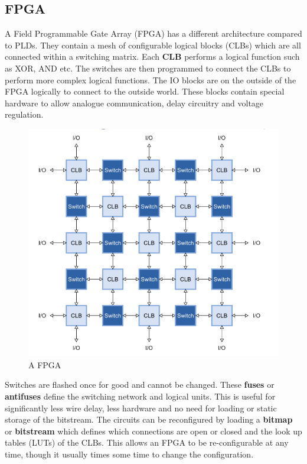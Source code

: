 \documentclass[11pt]{article}
\begin{document}
\subsection{FPGA}
A Field Programmable Gate Array (FPGA) has a different architecture compared to PLDs. They contain a mesh of configurable logical blocks (CLBs) which are all connected within a switching matrix. Each \textbf{CLB} performs a logical function such as XOR, AND etc. The switches are then programmed to connect the CLBs to perform more complex logical functions. The IO blocks are on the outside of the FPGA logically to connect to the outside world. These blocks contain special hardware to allow analogue communication, delay circuitry and voltage regulation. 
\begin{figure}[H]
\centering
\includegraphics[width=1\textwidth, keepaspectratio]{imgs/fpga.png}
\caption{A FPGA}
\end{figure}
\noindent
Switches are flashed once for good and cannot be changed. These \textbf{fuses} or \textbf{antifuses} define the switching network and logical units. This is useful for significantly less wire delay, less hardware and no need for loading or static storage of the bitstream. 
\n
The circuits can be reconfigured by loading a \textbf{bitmap} or \textbf{bitstream} which defines which connections are open or closed and the look up tables (LUTs) of the CLBs. This allows an FPGA to be re-configurable at any time, though it usually times some time to change the configuration. 
\end{document}
